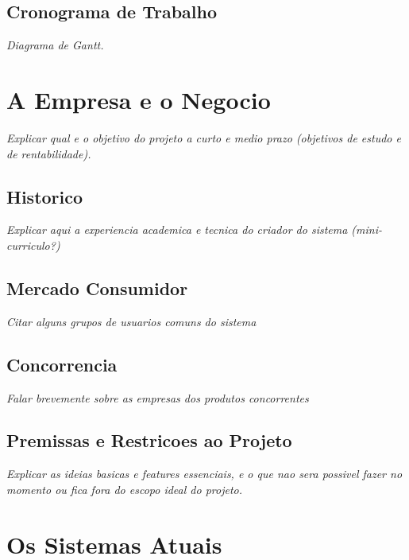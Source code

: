 \documentclass[a4paper,article]{abnt}
\begin{document}
\section{Cronograma de Trabalho}
\emph{Diagrama de Gantt.}

\chapter{A Empresa e o Negocio}
\emph{Explicar qual e o objetivo do projeto a curto e medio prazo (objetivos de estudo e de rentabilidade).}

\section{Historico}
\emph{Explicar aqui a experiencia academica e tecnica do criador do sistema (mini-curriculo?)}

\section{Mercado Consumidor}
\emph{Citar alguns grupos de usuarios comuns do sistema}

\section{Concorrencia}
\emph{Falar brevemente sobre as empresas dos produtos concorrentes}

\section{Premissas e Restricoes ao Projeto}
\emph{Explicar as ideias basicas e features essenciais, e o que nao sera possivel fazer no momento ou fica fora do escopo ideal do projeto.}

\chapter{Os Sistemas Atuais}
\end{document}
